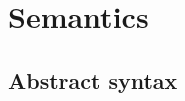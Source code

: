 
\newcommand{\trans}[1]{\mbox{$\stackrel{#1}{\rightarrow}$}}
\newcommand{\vanish}{\raisebox{-0mm}{$\;\rotatebox{90}{$\scriptstyle \hookleftarrow$}$}}
\newcommand{\diewith}[1]{\raisebox{-0mm}{$\;\rotatebox{90}{$\scriptstyle \hookrightarrow$}^{#1}$}}
\newcommand{\catch}[2]{\mbox{$[#2]_{#1}$}}
\newcommand{\catchdo}[3]{\mbox{$[#1\stackrel{#2}{\hookrightarrow}#3]$}}
\newcommand{\try}[1]{\mbox{$[#1]_{\delta}$}}
\newcommand{\trydo}[2]{\catchdo{#1}{\delta}{#2}}
\newcommand{\deadlock}{\diewith{\delta}}
\newcommand{\merge}[2]{\mbox{$#1\;\&\;#2$}}
\newcommand{\WLOOP}[2]{\mbox{$#1^{(\omega_c, \omega_s)}_{#2}$}}

\newcommand{\RUN}{\mbox{\it Run}}
\newcommand{\RUNE}{\mbox{${\cal R}_e$}}

\newcommand{\ACTIONS}{\mbox{$\cal A$}}
\newcommand{\TRACES}{\mbox{$\cal T$}}
\newcommand{\CONSTRAINTS}{\mbox{$\cal C$}}
\newcommand{\TERMINATIONS}{\mbox{$\cal X$}}

\newcommand{\ITE}[3]{(#1)?\;#2\,:\,#3}
\newcommand{\LET}{\mbox{\it let}}
\newcommand{\IN}{\mbox{\it in}}
\newcommand{\WHERE}{\mbox{\it where}}

\section{Semantics}
\label{semantics}

\subsection{Abstract syntax}

